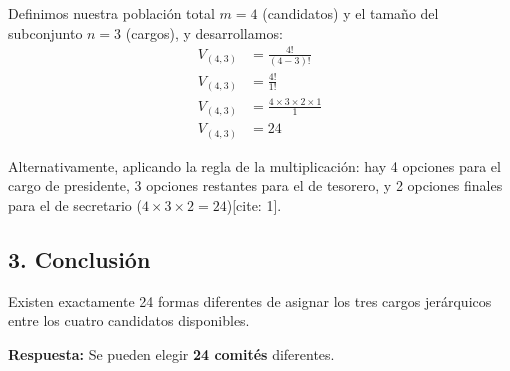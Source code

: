 \documentclass[12pt, a4paper]{article}
\begin{document}
Definimos nuestra población total $m = 4$ (candidatos) y el tamaño del subconjunto $n = 3$ (cargos), y desarrollamos:
\begin{align*}
V_{(4,3)} &= \frac{4!}{(4-3)!} \\
V_{(4,3)} &= \frac{4!}{1!} \\
V_{(4,3)} &= \frac{4 \times 3 \times 2 \times 1}{1} \\
V_{(4,3)} &= 24
\end{align*}

Alternativamente, aplicando la regla de la multiplicación: hay 4 opciones para el cargo de presidente, 3 opciones restantes para el de tesorero, y 2 opciones finales para el de secretario ($4 \times 3 \times 2 = 24$)[cite: 1].

\subsection*{3. Conclusión}
Existen exactamente 24 formas diferentes de asignar los tres cargos jerárquicos entre los cuatro candidatos disponibles.

\vspace{0.5cm}

\textbf{Respuesta:} Se pueden elegir \textbf{24 comités} diferentes.
\end{document}
